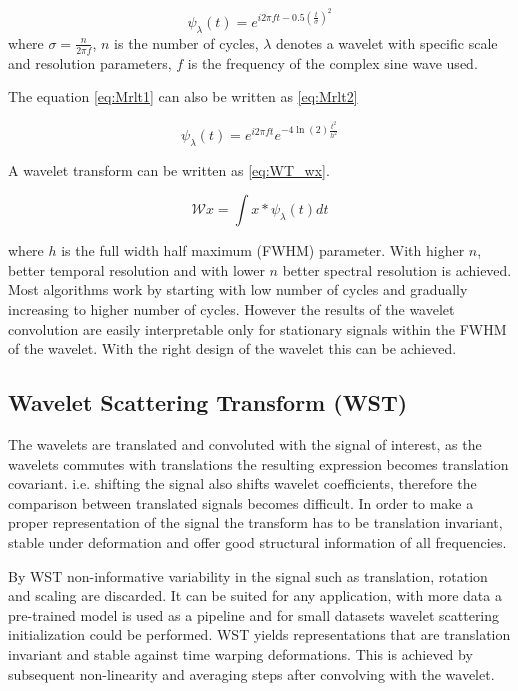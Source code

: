 \begin{equation} \label{eq:Mrlt1}
    \psi_\lambda(t) = e^{i2\pi ft -0.5(\frac{t}{\sigma})^2}
\end{equation}
where $\sigma = \frac{n}{2\pi f}$, $n$ is the number of cycles, $\lambda$ denotes a wavelet with specific scale and resolution parameters, $f$ is the frequency of the complex sine wave used.

The equation \ref{eq:Mrlt1} can also be written as  \ref{eq:Mrlt2}

\begin{equation} \label{eq:Mrlt2}
    \psi_\lambda(t) = e^{i2\pi ft} e^{-4\ln(2)\frac{t^2}{h^2}}
\end{equation}

A wavelet transform can be written as \ref{eq:WT_wx}.

\begin{equation} \label{eq:WT_wx}
    \mathcal{W}x  = \int x \ast \psi_\lambda(t) dt
\end{equation}

where $h$ is the full width half maximum (FWHM) parameter. With higher $n$, better temporal resolution and with lower $n$ better spectral resolution is achieved. Most algorithms work by starting with low number of cycles and gradually increasing to higher number of cycles. However the results of the wavelet convolution are easily interpretable only for stationary signals within the FWHM of the wavelet. With the right design of the wavelet this can be achieved.

\subsection{Wavelet Scattering Transform (WST)}
The wavelets are translated and convoluted with the signal of interest, as the wavelets commutes with translations the resulting expression becomes translation covariant. i.e. shifting the signal also shifts wavelet coefficients, therefore the comparison between translated signals becomes difficult. In order to make a proper representation of the signal the transform has to be translation invariant, stable under deformation and offer good structural information of all frequencies.

By WST non-informative variability in the signal such as translation, rotation and scaling are discarded. It can be suited for any application, with more data a pre-trained model is used as a pipeline and for small datasets wavelet scattering initialization could be performed. WST yields representations that are translation invariant and stable against time warping deformations. This is achieved by subsequent non-linearity and averaging steps after convolving with the wavelet. 

